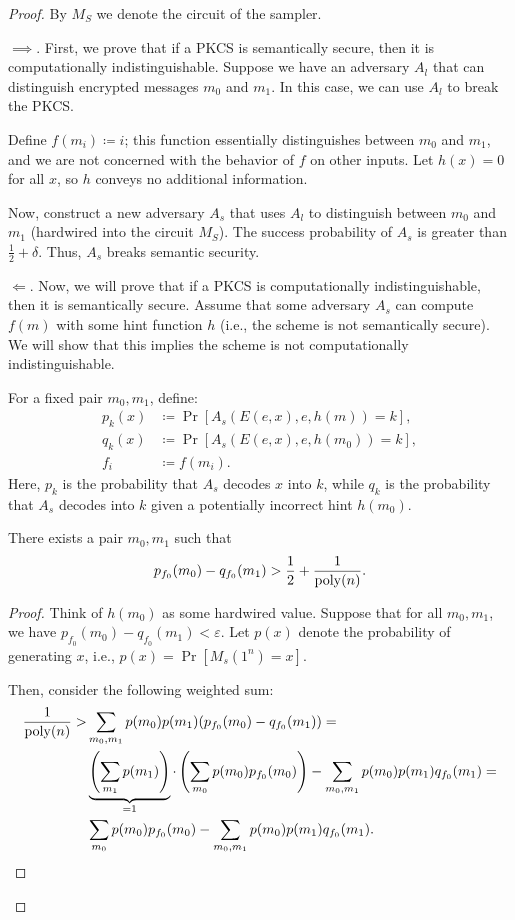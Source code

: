\begin{proof}
	By $M_S$ we denote the circuit of the sampler.

	$\implies$. First, we prove that if a PKCS is semantically secure, then it is computationally indistinguishable.
	Suppose we have an adversary $A_l$ that can distinguish encrypted messages $m_0$ and $m_1$.
	In this case, we can use $A_l$ to break the PKCS.

	Define $f(m_i) \coloneqq i$; this function essentially distinguishes between $m_0$ and $m_1$, and we are not concerned with the behavior of $f$ on other inputs.
	Let $h(x) = 0$ for all $x$, so $h$ conveys no additional information.

	Now, construct a new adversary $A_s$ that uses $A_l$ to distinguish between $m_0$ and $m_1$ (hardwired into the circuit $M_S$).
	The success probability of $A_s$ is greater than $\frac{1}{2} + \delta$.
	Thus, $A_s$ breaks semantic security.

	$\Longleftarrow$. Now, we will prove that if a PKCS is computationally indistinguishable, then it is semantically secure.
	Assume that some adversary $A_s$ can compute $f(m)$ with some hint function $h$ (i.e., the scheme is not semantically secure).
	We will show that this implies the scheme is not computationally indistinguishable.

	For a fixed pair $m_0, m_1$, define:
	\begin{align*}
		p_k(x) &\coloneqq \Pr[A_s(E(e, x), e, h(m)) = k], \\
		q_k(x) &\coloneqq \Pr[A_s(E(e, x), e, h(m_0)) = k], \\
		f_i &\coloneqq f(m_i).
	\end{align*}
	Here, $p_k$ is the probability that $A_s$ decodes $x$ into $k$, while $q_k$ is the probability that $A_s$ decodes into $k$ given a potentially incorrect hint $h(m_0)$.

	\begin{lemma}
		There exists a pair $m_0, m_1$ such that
		\[
			p_{f_0}(m_0) - q_{f_0}(m_1) > \frac{1}{2} + \frac{1}{\operatorname{poly}(n)}.
		\] 
	\end{lemma}

	\begin{proof}
		Think of $h(m_0)$ as some hardwired value.
		Suppose that for all $m_0, m_1$, we have $p_{f_0}(m_0) - q_{f_0}(m_1) < \varepsilon$.
		Let $p(x)$ denote the probability of generating $x$, i.e., $p(x) = \Pr[M_s(1^{n}) = x]$.

		Then, consider the following weighted sum:
		\begin{align*}
			\frac{1}{\operatorname{poly}(n)} > &\sum_{m_0, m_1} p(m_0) p(m_1) (p_{f_0}(m_0) - q_{f_0}(m_1)) = \\
			&\underbrace{\left(\sum_{m_1} p(m_1)\right)}_{=1} \cdot \left(\sum_{m_0} p(m_0) p_{f_0}(m_0)\right) - \sum_{m_0, m_1} p(m_0) p(m_1) q_{f_0}(m_1) = \\
			&\sum_{m_0} p(m_0) p_{f_0}(m_0) - \sum_{m_0, m_1} p(m_0) p(m_1) q_{f_0}(m_1).
		\end{align*}


\end{proof}
\end{proof}
